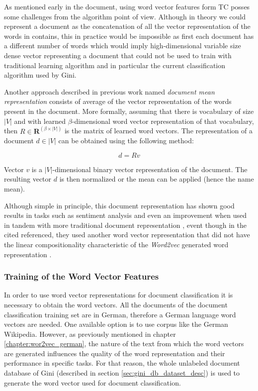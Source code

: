 As mentioned early in the document, using word vector features form \ac{TC}
posses some challenges from the algorithm point of view. Although in theory
we could represent a document as the concatenation of all the vector
representation of the words in contains, this in practice would be impossible
as first each document has a different number of words which would imply
high-dimensional variable size dense vector representing a document that
could not be used to train with traditional learning algorithm and in
particular the current classification algorithm used by Gini.

Another approach described in previous work \cite{maas2011learning}  named \textit{document mean
  representation} consists of average of the vector representation of the  words
present in the document.  More formally, assuming that there is  vocabulary of
size $|V|$ and with learned $\beta$-dimensional word vector representation of
that vocabulary, then  $R  \in \mathbf{R}^{(\beta \times |V|)}$  is  the
matrix of learned word vectors.  The representation of a document $d \in |V|$ can be obtained using the following method:

$$d = Rv$$

Vector $v$ is a $|V|$-dimensional  binary vector representation of the
document.   The resulting vector $d$ is then  normalized or the mean can be
applied (hence the name mean).


Although simple in principle, this document representation has  shown good
results in tasks  such as sentiment analysis and even an improvement when used in tandem
with more traditional document representation  \cite{maas2010probabilistic},
event though in the cited referenced, they used another word vector representation that
did not have the linear compositionality characteristic of the
\textit{Word2vec} generated word representation \cite{MikolovSCCD13}.


\subsubsection{Training of the Word Vector Features}
\label{sec:sub_w2v_4tc_training-word-vector}
In order to use word vector representations for  document classification it
is necessary to obtain the word vectors.  All the documents of the
document classification training set are in German, therefore  a German language word
vectors are needed.  One available option is to use  corpus like the German
Wikipedia. However, as previously mentioned in chapter
\ref{chapter:wor2vec_german}, the nature of the text from which the word
vectors are generated influences the quality of the word representation and their
performance in specific tasks. For that reason, the whole unlabeled document
database of Gini  (described in section \ref{sec:gini_db_dataset_desc})   is
used to generate the word vector used for document classification. 

